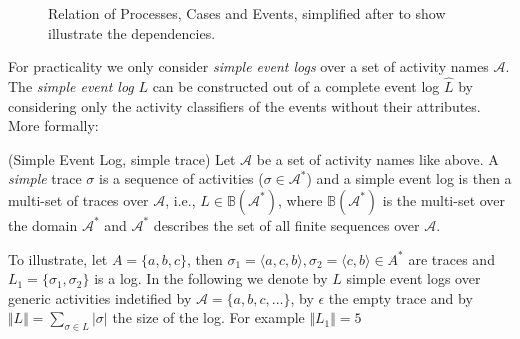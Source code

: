 \documentclass[a4paper]{IEEEtran}
\begin{document}
\begin{figure}[h!]
    \centering
    \caption{Relation of Processes, Cases and Events, simplified after \cite{process_mining} to show illustrate the dependencies. }
    \label{fig:processes}
\end{figure}
For practicality we only consider \textit{simple event logs} over a set of activity names $\mathcal{A}$. The \textit{simple event log} $L$ can be constructed out of a complete event log $\hat{L}$ by considering only the activity classifiers of the events without their attributes. More formally:
\begin{defn} (Simple Event Log, simple trace) \cite{inductivemining-constructive}
Let $\mathcal{A}$ be a set of activity names like above. A \textit{simple} trace $\sigma$ is a sequence of activities ($\sigma \in \mathcal{A}^*$) and a simple event log is then a multi-set of traces over $\mathcal{A}$, i.e., $L \in \mathbb{B}(\mathcal{A}^*)$, where $\mathbb{B}(\mathcal{A}^*)$ is the multi-set over the domain $\mathcal{A}^*
$ and $\mathcal{A}^*$ describes the set of all finite sequences over $\mathcal{A}$.
\end{defn}
To illustrate, let $A = \{ a,b,c \} $, then $ \sigma_1 = \langle a, c, b\rangle, \sigma_2 = \langle c, b\rangle \in A^*$ are traces and $L_1 = \{ \sigma_1, \sigma_2 \}$ is a log.
In the following we denote by $L$ simple event logs over generic activities indetified by $\mathcal{A} = \{a, b, c, \dots \}$, by $\epsilon$ the empty trace and by $\Vert L \Vert = \sum_{\sigma \in L} |\sigma|$ the size of the log. For example $ \Vert L_1 \Vert = 5$
\end{document}
